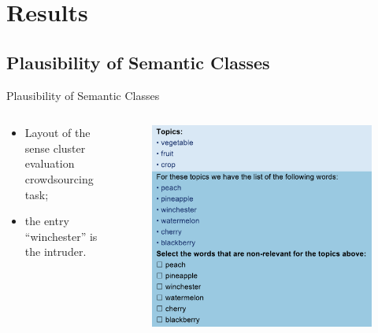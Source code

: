 \documentclass[usenames,dvipsnames,notes]{beamer}
\begin{document}
\section{Results}
\subsection{Plausibility of Semantic Classes}

\begin{frame}{Plausibility of Semantic Classes}

\begin{columns}
\begin{column}{0.4\textwidth}
 \begin{itemize}
\item Layout of the sense cluster evaluation crowdsourcing task;
 
 \item the entry ``winchester'' is the intruder.
\end{itemize}
\end{column}
\begin{column}{0.6\textwidth}  

\begin{figure}
  \centering
  \includegraphics[width=.99\textwidth]{figures/cluster-hit}
\end{figure}

\end{column}
\end{columns}





\end{frame}
\end{document}
